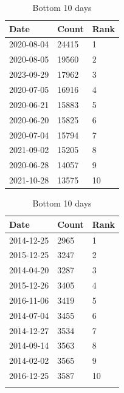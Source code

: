 \documentclass[12pt, titlepage]{article}
\begin{document}
\begin{table}[htbp]
	\begin{minipage}[t]{0.35\textwidth} %
	\centering
	\small %
	\caption{Top 10 days}
	\label{tab:top_ten_counts}
		\begin{tabular}{@{}lll@{}}
			\toprule
			Date & Count & Rank \\
			\midrule
			2020-08-04 & 24415 & 1 \\
			2020-08-05 & 19560 & 2 \\
			2023-09-29 & 17962 & 3 \\
			2020-07-05 & 16916 & 4 \\
			2020-06-21 & 15883 & 5 \\
			2020-06-20 & 15825 & 6 \\
			2020-07-04 & 15794 & 7 \\
			2021-09-02 & 15205 & 8 \\
			2020-06-28 & 14057 & 9 \\
			2021-10-28 & 13575 & 10 \\
			\bottomrule
		\end{tabular}
	\end{minipage}\hfill %
	\begin{minipage}[t]{0.35\textwidth} %
	\centering
	\small %
	\caption{Bottom 10 days}
	\label{tab:bottom_ten_counts}
		\begin{tabular}{@{}lll@{}}
			\toprule
			Date & Count & Rank \\
			\midrule
			2014-12-25 & 2965 & 1 \\
			2015-12-25 & 3247 & 2 \\
			2014-04-20 & 3287 & 3 \\
			2015-12-26 & 3405 & 4 \\
			2016-11-06 & 3419 & 5 \\
			2014-07-04 & 3455 & 6 \\
			2014-12-27 & 3534 & 7 \\
			2014-09-14 & 3563 & 8 \\
			2014-02-02 & 3565 & 9 \\
			2016-12-25 & 3587 & 10 \\
			\bottomrule\\
		\end{tabular}
	\end{minipage}
\end{table}
\end{document}
